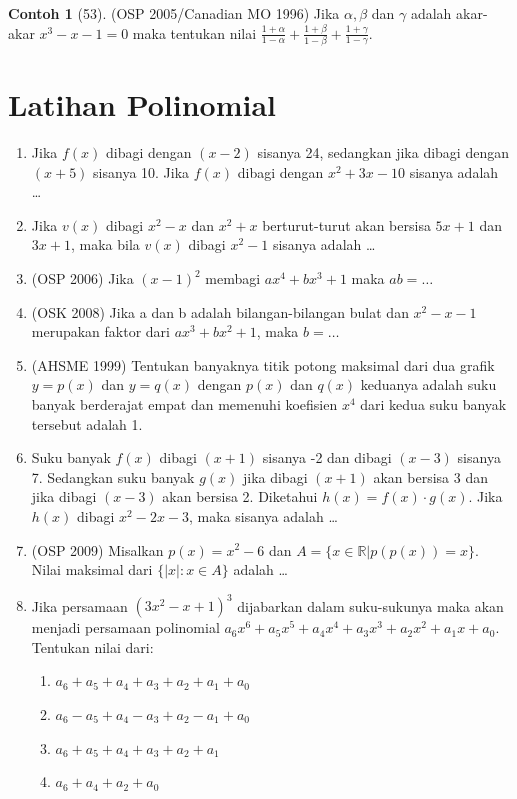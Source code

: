\documentclass[12pt]{scrartcl}
\theoremstyle{definition}
\newtheorem{contoh}{Contoh}
\begin{document}
\begin{contoh}[53]
(OSP 2005/Canadian MO 1996) Jika $\alpha, \beta$ dan $\gamma$ adalah akar-akar $x^3-x-1=0$ maka tentukan nilai $\frac{1+\alpha}{1-\alpha} + \frac{1+\beta}{1-\beta} + \frac{1+\gamma}{1-\gamma}$.
\end{contoh}

\section*{Latihan Polinomial}
\begin{enumerate}
    \item Jika $f(x)$ dibagi dengan $(x-2)$ sisanya 24, sedangkan jika dibagi dengan $(x+5)$ sisanya 10. Jika $f(x)$ dibagi dengan $x^2+3x-10$ sisanya adalah \dots
    
    \item Jika $v(x)$ dibagi $x^2-x$ dan $x^2+x$ berturut-turut akan bersisa $5x+1$ dan $3x+1$, maka bila $v(x)$ dibagi $x^2-1$ sisanya adalah \dots
    
    \item (OSP 2006) Jika $(x-1)^2$ membagi $ax^4+bx^3+1$ maka $ab = \dots$
    
    \item (OSK 2008) Jika a dan b adalah bilangan-bilangan bulat dan $x^2-x-1$ merupakan faktor dari $ax^3+bx^2+1$, maka $b = \dots$
    
    \item (AHSME 1999) Tentukan banyaknya titik potong maksimal dari dua grafik $y=p(x)$ dan $y=q(x)$ dengan $p(x)$ dan $q(x)$ keduanya adalah suku banyak berderajat empat dan memenuhi koefisien $x^4$ dari kedua suku banyak tersebut adalah 1.
    
    \item Suku banyak $f(x)$ dibagi $(x+1)$ sisanya -2 dan dibagi $(x-3)$ sisanya 7. Sedangkan suku banyak $g(x)$ jika dibagi $(x+1)$ akan bersisa 3 dan jika dibagi $(x-3)$ akan bersisa 2. Diketahui $h(x)=f(x) \cdot g(x)$. Jika $h(x)$ dibagi $x^2-2x-3$, maka sisanya adalah \dots
    
    \item (OSP 2009) Misalkan $p(x)=x^2-6$ dan $A=\{x \in \mathbb{R} | p(p(x))=x\}$. Nilai maksimal dari $\{|x| : x \in A\}$ adalah \dots
    
    \item Jika persamaan $(3x^2-x+1)^3$ dijabarkan dalam suku-sukunya maka akan menjadi persamaan polinomial $a_6 x^6 + a_5 x^5 + a_4 x^4 + a_3 x^3 + a_2 x^2 + a_1 x + a_0$. Tentukan nilai dari:
    \begin{enumerate}
        \item[a)] $a_6 + a_5 + a_4 + a_3 + a_2 + a_1 + a_0$
        \item[b)] $a_6 - a_5 + a_4 - a_3 + a_2 - a_1 + a_0$
        \item[c)] $a_6 + a_5 + a_4 + a_3 + a_2 + a_1$
        \item[d)] $a_6 + a_4 + a_2 + a_0$
    \end{enumerate}
    

\end{enumerate}
\end{document}
